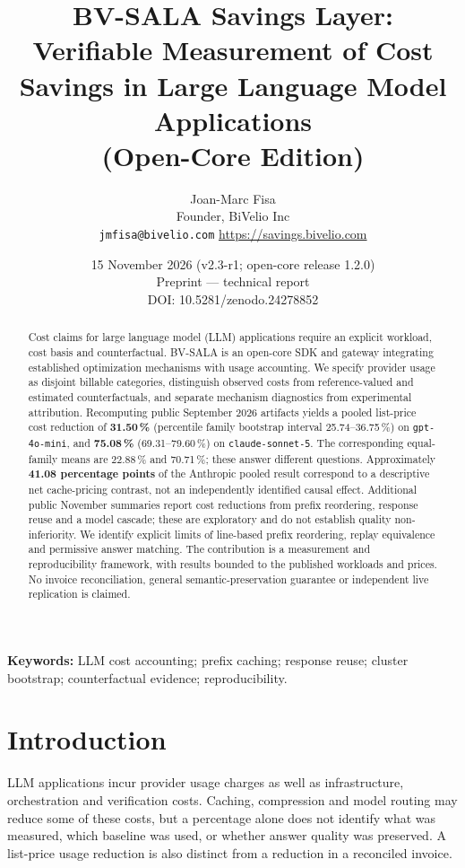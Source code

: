 \documentclass[11pt,a4paper]{article}
\title{BV-SALA Savings Layer:\\ Verifiable Measurement of Cost Savings in Large Language Model Applications\\ \large (Open-Core Edition)}
\author{Joan-Marc Fisa\\ \small Founder, BiVelio Inc\\ \small \texttt{jmfisa@bivelio.com} \quad \url{https://savings.bivelio.com}}
\date{15 November 2026 (v2.3-r1; open-core release 1.2.0) \\ \small Preprint --- technical report\\ \small DOI: 10.5281/zenodo.24278852}
\begin{document}
\maketitle

\begin{abstract}
Cost claims for large language model (LLM) applications require an explicit workload, cost
basis and counterfactual. BV-SALA is an open-core SDK and gateway integrating established
optimization mechanisms with usage accounting. We specify provider usage as disjoint billable
categories, distinguish observed costs from reference-valued and estimated counterfactuals,
and separate mechanism diagnostics from experimental attribution. Recomputing public
September 2026 artifacts yields a pooled list-price cost reduction of \textbf{31.50\,\%}
(percentile family bootstrap interval 25.74--36.75\,\%) on \texttt{gpt-4o-mini}, and
\textbf{75.08\,\%} (69.31--79.60\,\%) on \texttt{claude-sonnet-5}. The corresponding
equal-family means are 22.88\,\% and 70.71\,\%; these answer different questions.
Approximately \textbf{41.08 percentage points} of the Anthropic pooled result correspond to a
descriptive net cache-pricing contrast, not an independently identified causal effect.
Additional public November summaries report cost reductions from prefix reordering, response
reuse and a model cascade; these are exploratory and do not establish quality
non-inferiority. We identify explicit limits of line-based prefix reordering, replay
equivalence and permissive answer matching. The contribution is a measurement and
reproducibility framework, with results bounded to the published workloads and prices. No
invoice reconciliation, general semantic-preservation guarantee or independent live replication
is claimed.
\end{abstract}

\noindent\textbf{Keywords:} LLM cost accounting; prefix caching; response reuse; cluster
bootstrap; counterfactual evidence; reproducibility.

\clearpage

\section{Introduction}\label{sec:intro}

LLM applications incur provider usage charges as well as infrastructure, orchestration and
verification costs. Caching, compression and model routing may reduce some of these costs, but
a percentage alone does not identify what was measured, which baseline was used, or whether
answer quality was preserved. A list-price usage reduction is also distinct from a reduction in
a reconciled invoice.
\end{document}
